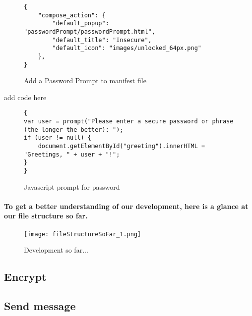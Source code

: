 \begin{figure}[H]
\centering
\begin{verbatim}
{
    "compose_action": {
        "default_popup": "passwordPrompt/passwordPrompt.html",
        "default_title": "Insecure",
        "default_icon": "images/unlocked_64px.png"
    },
}
\end{verbatim}
\caption{\label{fig: addPwToManifest} Add a Password Prompt to manifest file}
\end{figure}

add code here
\begin{figure}[H]
\centering
\begin{verbatim}
{
var user = prompt("Please enter a secure password or phrase (the longer the better): ");
if (user != null) {
    document.getElementById("greeting").innerHTML = "Greetings, " + user + "!";
}
}
\end{verbatim}
\caption{\label{fig: pwPrompt} Javascript prompt for password}
\end{figure}

\paragraph{To get a better understanding of our development, here is a glance at our file structure so far.}

\begin{figure}[H]
    \centering
    \texttt{[image: fileStructureSoFar\_1.png]}
    \caption{\label{fig: folderStructure1} Development so far...}
\end{figure}



\subsection{Encrypt}
\subsection{Send message}





